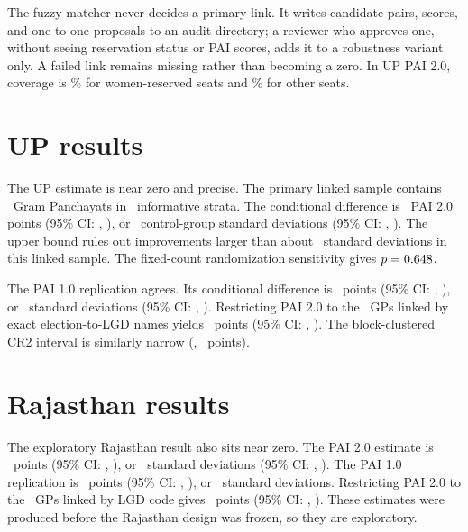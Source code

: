 \documentclass[12pt]{article}
\begin{document}
The fuzzy matcher never decides a primary link. It writes candidate pairs, scores, and one-to-one proposals to an audit directory; a reviewer who approves one, without seeing reservation status or PAI scores, adds it to a robustness variant only. A failed link remains missing rather than becoming a zero. In UP PAI 2.0, coverage is \UpPaiTwoWomenMatchPct\% for women-reserved seats and \UpPaiTwoOpenMatchPct\% for other seats.

\section{UP results}

The UP estimate is near zero and precise. The primary linked sample contains \UpPaiTwoN\ Gram Panchayats in \UpPaiTwoStrata\ informative strata. The conditional difference is \UpPaiTwoDifference\ PAI 2.0 points (95\% CI: \UpPaiTwoCILow, \UpPaiTwoCIHigh), or \UpPaiTwoDifferenceSD\ control-group standard deviations (95\% CI: \UpPaiTwoCILowSD, \UpPaiTwoCIHighSD). The upper bound rules out improvements larger than about \UpPaiTwoCIHighSD\ standard deviations in this linked sample. The fixed-count randomization sensitivity gives $p=0.648$.

The PAI 1.0 replication agrees. Its conditional difference is \UpPaiOneDifference\ points (95\% CI: \UpPaiOneCILow, \UpPaiOneCIHigh), or \UpPaiOneDifferenceSD\ standard deviations (95\% CI: \UpPaiOneCILowSD, \UpPaiOneCIHighSD). Restricting PAI 2.0 to the \UpPaiTwoExactN\ GPs linked by exact election-to-LGD names yields \UpPaiTwoExactDifference\ points (95\% CI: \UpPaiTwoExactCILow, \UpPaiTwoExactCIHigh). The block-clustered CR2 interval is similarly narrow (\UpPaiTwoCRTwoCILow, \UpPaiTwoCRTwoCIHigh\ points).

\begin{table}[htbp]
\centering
\caption{Women's reservations and UP PAI Good Governance}
\label{tab:up_pai_effects}
\small

\end{table}

\section{Rajasthan results}

The exploratory Rajasthan result also sits near zero. The PAI 2.0 estimate is \RajPaiTwoDifference\ points (95\% CI: \RajPaiTwoCILow, \RajPaiTwoCIHigh), or \RajPaiTwoDifferenceSD\ standard deviations (95\% CI: \RajPaiTwoCILowSD, \RajPaiTwoCIHighSD). The PAI 1.0 replication is \RajPaiOneDifference\ points (95\% CI: \RajPaiOneCILow, \RajPaiOneCIHigh), or \RajPaiOneDifferenceSD\ standard deviations. Restricting PAI 2.0 to the \RajPaiTwoCodeLinkN\ GPs linked by LGD code gives \RajPaiTwoCodeLinkDifference\ points (95\% CI: \RajPaiTwoCodeLinkCILow, \RajPaiTwoCodeLinkCIHigh). These estimates were produced before the Rajasthan design was frozen, so they are exploratory.
\end{document}
